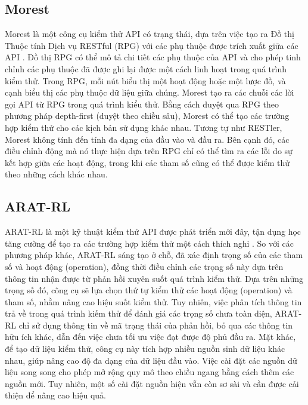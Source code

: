 \subsection{Morest}

Morest là một công cụ kiểm thử API có trạng thái, dựa trên việc tạo ra Đồ thị Thuộc tính Dịch vụ RESTful (RPG) với các phụ thuộc được trích xuất giữa các API \cite{liu2022morest}. Đồ thị RPG có thể mô tả chi tiết các phụ thuộc của API và cho phép tinh chỉnh các phụ thuộc đã được ghi lại được một cách linh hoạt trong quá trình kiểm thử. Trong RPG, mỗi nút biểu thị một hoạt động hoặc một lược đồ, và cạnh biểu thị các phụ thuộc dữ liệu giữa chúng. Morest tạo ra các chuỗi các lời gọi API từ RPG trong quá trình kiểu thử. Bằng cách duyệt qua RPG theo phương pháp depth-first (duyệt theo chiều sâu), Morest có thể tạo các trường hợp kiểm thử cho các kịch bản sử dụng khác nhau. Tương tự như RESTler, Morest không tính đến tính đa dạng của đầu vào và đầu ra. Bên cạnh đó, các điều chỉnh động mà nó thực hiện dựa trên RPG chỉ có thể tìm ra các lỗi do sự kết hợp giữa các hoạt động, trong khi các tham số cũng có thể được kiểm thử theo những cách khác nhau.
\subsection{ARAT-RL}

ARAT-RL là một kỹ thuật kiểm thử API được phát triển mới đây, tận dụng học tăng cường để tạo ra các trường hợp kiểm thử một cách thích nghi \cite{kim2023adaptive}. So với các phương pháp khác, ARAT-RL sáng tạo ở chỗ, đã xác định trọng số của các tham số và hoạt động (operation), đồng thời điều chỉnh các trọng số này dựa trên thông tin nhận được từ phản hồi xuyên suốt quá trình kiểm thử. Dựa trên những trọng số đó, công cụ sẽ lựa chọn thứ tự kiểm thử các hoạt động (operation) và tham số, nhằm nâng cao hiệu suốt kiểm thử. Tuy nhiên, việc phân tích thông tin trả về trong quá trình kiếm thử để đánh giá các trọng số chưa toàn diện, ARAT-RL chỉ sử dụng thông tin về mã trạng thái của phản hồi, bỏ qua các thông tin hữu ích khác, dẫn đến việc chưa tối ưu việc đạt được độ phủ đầu ra. Mặt khác, để tạo dữ liệu kiểm thử, công cụ này tích hợp nhiều nguồn sinh dữ liệu khác nhau, giúp nâng cao độ đa dạng của dữ liệu đầu vào. Việc cài đặt các nguồn dữ liệu song song cho phép mở rộng quy mô theo chiều ngang bằng cách thêm các nguồn mới. Tuy nhiên, một số cài đặt nguồn hiện vẫn còn sơ sài và cần được cải thiện để nâng cao hiệu quả.